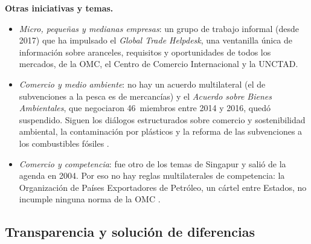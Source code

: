 \documentclass[11pt]{article}
\begin{document}
\begin{anotaciones}
\textbf{Otras iniciativas y temas.}
\begin{itemize}
\item \emph{Micro, pequeñas y medianas empresas}: un grupo de trabajo informal (desde 2017) que ha impulsado el \emph{Global Trade Helpdesk}, una ventanilla única de información sobre aranceles, requisitos y oportunidades de todos los mercados, de la OMC, el Centro de Comercio Internacional y la UNCTAD\nocite{OMC2026IniciativasConjuntas}.
\item \emph{Comercio y medio ambiente}: no hay un acuerdo multilateral (el de subvenciones a la pesca es de mercancías) y el \emph{Acuerdo sobre Bienes Ambientales}, que negociaron 46~miembros entre 2014 y 2016, quedó suspendido. Siguen los diálogos estructurados sobre comercio y sostenibilidad ambiental, la contaminación por plásticos y la reforma de las subvenciones a los combustibles fósiles\nocite{OMC2026Medioambiente} .
\item \emph{Comercio y competencia}: fue otro de los temas de Singapur y salió de la agenda en 2004. Por eso no hay reglas multilaterales de competencia: la Organización de Países Exportadores de Petróleo, un cártel entre Estados, no incumple ninguna norma de la OMC .
\end{itemize}
\end{anotaciones}

\subsection{Transparencia y solución de diferencias}\label{sec:transparencia}
\end{document}
